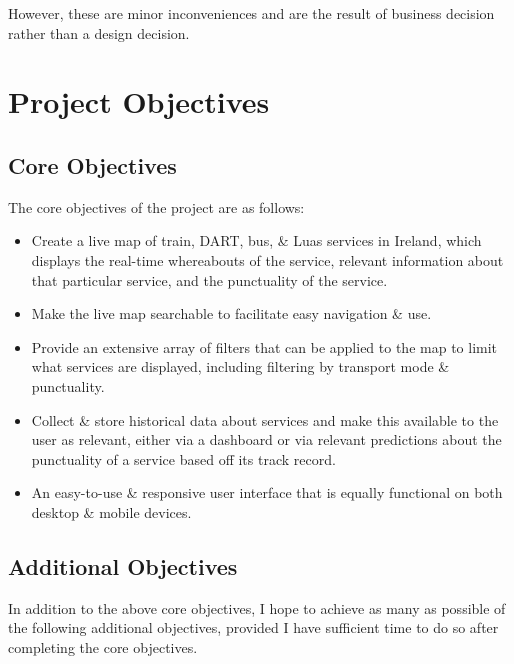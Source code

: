 \documentclass[a4paper,11pt]{article}
\begin{document}
However, these are minor inconveniences and are the result of business decision rather than a design decision.





\section{Project Objectives}
\subsection{Core Objectives}
The core objectives of the project are as follows:
\begin{itemize}
    \item   Create a live map of train, DART, bus, \& Luas services in Ireland, which displays the real-time whereabouts of the service, relevant information about that particular service, and the punctuality of the service.
    \item   Make the live map searchable to facilitate easy navigation \& use.
    \item   Provide an extensive array of filters that can be applied to the map to limit what services are displayed, including filtering by transport mode \& punctuality.
    \item   Collect \& store historical data about services and make this available to the user as relevant, either via a dashboard or via relevant predictions about the punctuality of a service based off its track record.
    \item   An easy-to-use \& responsive user interface that is equally functional on both desktop \& mobile devices.
\end{itemize}
\subsection{Additional Objectives}
In addition to the above core objectives, I hope to achieve as many as possible of the following additional objectives, provided I have sufficient time to do so after completing the core objectives.
\end{document}
